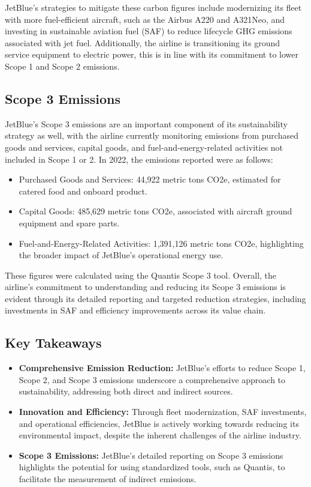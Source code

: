 JetBlue's strategies to mitigate these carbon figures include modernizing its fleet with more fuel-efficient aircraft, such as the Airbus A220 and A321Neo, and investing in sustainable aviation fuel (SAF) to reduce lifecycle GHG emissions associated with jet fuel. Additionally, the airline is transitioning its ground service equipment to electric power, this is in line with its commitment to lower Scope 1 and Scope 2 emissions.

\subsection*{Scope 3 Emissions}
JetBlue's Scope 3 emissions are an important component of its sustainability strategy as well, with the airline currently monitoring emissions from purchased goods and services, capital goods, and fuel-and-energy-related activities not included in Scope 1 or 2. In 2022, the emissions reported were as follows:

\begin{itemize}
    \item Purchased Goods and Services: 44,922 metric tons CO2e, estimated for catered food and onboard product.
    \item Capital Goods: 485,629 metric tons CO2e, associated with aircraft ground equipment and spare parts.
    \item Fuel-and-Energy-Related Activities: 1,391,126 metric tons CO2e, highlighting the broader impact of JetBlue's operational energy use.
\end{itemize}

These figures were calculated using the Quantis Scope 3 tool. Overall, the airline's commitment to understanding and reducing its Scope 3 emissions is evident through its detailed reporting and targeted reduction strategies, including investments in SAF and efficiency improvements across its value chain.

\subsection*{Key Takeaways}
\begin{itemize}
    \item \textbf{Comprehensive Emission Reduction:} JetBlue's efforts to reduce Scope 1, Scope 2, and Scope 3 emissions underscore a comprehensive approach to sustainability, addressing both direct and indirect sources.
    \item \textbf{Innovation and Efficiency:} Through fleet modernization, SAF investments, and operational efficiencies, JetBlue is actively working towards reducing its environmental impact, despite the inherent challenges of the airline industry.
    \item \textbf{Scope 3 Emissions:} JetBlue's detailed reporting on Scope 3 emissions highlights the potential for using standardized tools, such as Quantis, to facilitate the measurement of indirect emissions.
\end{itemize}


